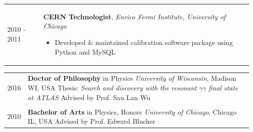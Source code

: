 \documentclass{letter}
\begin{document}
\begin{tabular}{p{}p{}}
  2010 - 2011
  &
  \textbf{CERN Technologist}, \textit{Enrico Fermi Institute, University of Chicago} \newline
  \vspace{-15pt}  %
  \begin{itemize}
    \itemsep0em
    \renewcommand{\labelitemi}{\tiny$\blacksquare$} 
    \item Developed \& maintained calibration software package using Python and MySQL
  \end{itemize}
\end{tabular}
\vspace{-10pt}



\begin{flushleft}
  \Large{\textsc{\textbf{\color{Maroon}{Education}}}}
  \vspace{1pt}  %
\end{flushleft}

\begin{tabular}{p{}p{}}

  2016
  &
  \textbf{Doctor of Philosophy} in Physics \newline 
  \textit{University of Wisconsin}, Madison WI, USA \newline
  Thesis: \textit{Search and discovery with the resonant $\gamma\gamma$ final state at ATLAS} \newline
  Advised by Prof. Sau Lan Wu \\
  \\

  2010 
  & 
  \textbf{Bachelor of Arts} in Physics, Honors \newline 
  \textit{University of Chicago}, Chicago IL, USA \newline
  Advised by Prof. Edward Blucher 
\end{tabular}
\end{document}
